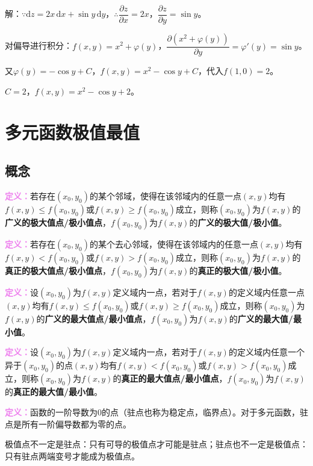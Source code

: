 \documentclass[UTF8, 12pt]{ctexart}
\begin{document}
        解：$\because\textrm{d}z=2x\,\textrm{d}x+\sin y\,\textrm{d}y$，$\therefore\dfrac{\partial z}{\partial x}=2x$，$\dfrac{\partial z}{\partial y}=\sin y$。

        对偏导进行积分：$f(x,y)=x^2+\varphi(y)$，$\dfrac{\partial(x^2+\varphi(y))}{\partial y}=\varphi'(y)=\sin y$。

        又$\varphi(y)=-\cos y+C$，$f(x,y)=x^2-\cos y+C$，代入$f(1,0)=2$。

        $C=2$，$f(x,y)=x^2-\cos y+2$。

        \section{多元函数极值最值}

        \subsection{概念}

        \textcolor{violet}{\textbf{定义：}}若存在$(x_0,y_0)$的某个邻域，使得在该邻域内的任意一点$(x,y)$均有$f(x,y)\leqslant f(x_0,y_0)$或$f(x,y)\geqslant f(x_0,y_0)$成立，则称$(x_0,y_0)$为$f(x,y)$的\textbf{广义的极大值点/极小值点}，$f(x_0,y_0)$为$f(x,y)$的\textbf{广义的极大值/极小值}。

        \textcolor{violet}{\textbf{定义：}}若存在$(x_0,y_0)$的某个去心邻域，使得在该邻域内的任意一点$(x,y)$均有$f(x,y)<f(x_0,y_0)$或$f(x,y)>f(x_0,y_0)$成立，则称$(x_0,y_0)$为$f(x,y)$的\textbf{真正的极大值点/极小值点}，$f(x_0,y_0)$为$f(x,y)$的\textbf{真正的极大值/极小值}。

        \textcolor{violet}{\textbf{定义：}}设$(x_0,y_0)$为$f(x,y)$定义域内一点，若对于$f(x,y)$的定义域内任意一点$(x,y)$均有$f(x,y)\leqslant f(x_0,y_0)$或$f(x,y)\geqslant f(x_0,y_0)$成立，则称$(x_0,y_0)$为$f(x,y)$的\textbf{广义的最大值点/最小值点}，$f(x_0,y_0)$为$f(x,y)$的\textbf{广义的最大值/最小值}。

        \textcolor{violet}{\textbf{定义：}}设$(x_0,y_0)$为$f(x,y)$定义域内一点，若对于$f(x,y)$的定义域内任意一个异于$(x_0,y_0)$的点$(x,y)$均有$f(x,y)<f(x_0,y_0)$或$f(x,y)>f(x_0,y_0)$成立，则称$(x_0,y_0)$为$f(x,y)$的\textbf{真正的最大值点/最小值点}，$f(x_0,y_0)$为$f(x,y)$的\textbf{真正的最大值/最小值}。

        \textcolor{violet}{\textbf{定义：}}函数的一阶导数为0的点（驻点也称为稳定点，临界点）。对于多元函数，驻点是所有一阶偏导数都为零的点。

        极值点不一定是驻点：只有可导的极值点才可能是驻点；驻点也不一定是极值点：只有驻点两端变号才能成为极值点。
\end{document}
